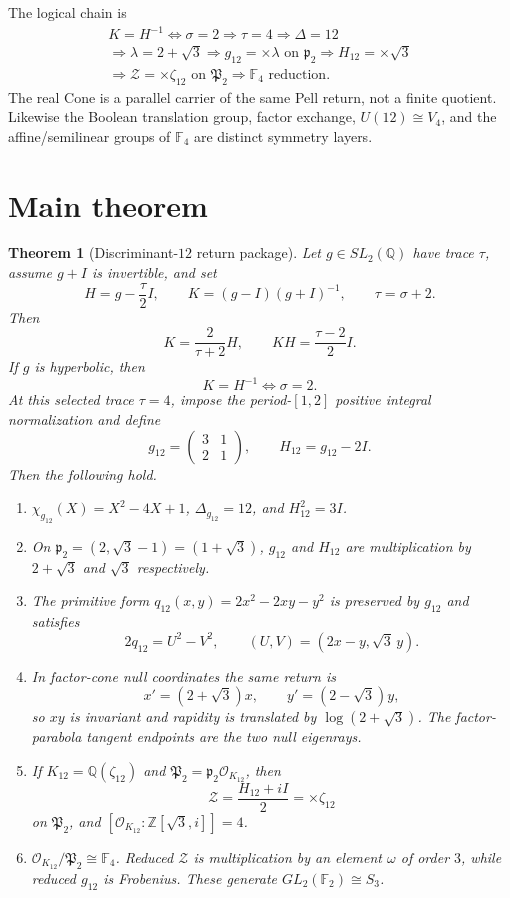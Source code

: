 \documentclass[11pt]{article}
\newtheorem{theorem}{Theorem}[section]
\theoremstyle{remark}
\newcommand{\Q}{\mathbb Q}
\newcommand{\Z}{\mathbb Z}
\newcommand{\F}{\mathbb F}
\newcommand{\OO}{\mathcal O}
\begin{document}
The logical chain is
\[
\boxed{
\begin{gathered}
K=H^{-1}\Longleftrightarrow\sigma=2
\Longrightarrow\tau=4\Longrightarrow\Delta=12\\
\Longrightarrow\lambda=2+\sqrt3
\Longrightarrow g_{12}=\times\lambda\text{ on }\mathfrak p_2
\Longrightarrow H_{12}=\times\sqrt3\\
\Longrightarrow \mathcal Z=\times\zeta_{12}\text{ on }\mathfrak P_2
\Longrightarrow \F_4\text{ reduction}.
\end{gathered}}
\]
The real Cone is a parallel carrier of the same Pell return, not a finite
quotient.  Likewise the Boolean translation group, factor exchange,
$U(12)\cong V_4$, and the affine/semilinear groups of $\F_4$ are distinct
symmetry layers.

\section{Main theorem}

\begin{theorem}[Discriminant-$12$ return package]
\label{thm:main}
Let $g\in SL_2(\Q)$ have trace $\tau$, assume $g+I$ is invertible, and set
\[
H=g-\frac\tau2I,
\qquad K=(g-I)(g+I)^{-1},
\qquad \tau=\sigma+2.
\]
Then
\[
K=\frac{2}{\tau+2}H,
\qquad KH=\frac{\tau-2}{2}I.
\]
If $g$ is hyperbolic, then
\[
K=H^{-1}\iff\sigma=2.
\]
At this selected trace $\tau=4$, impose the period-$[1,2]$ positive integral
normalization and define
\[
g_{12}=\begin{pmatrix}3&1\\2&1\end{pmatrix},
\qquad
H_{12}=g_{12}-2I.
\]
Then the following hold.
\begin{enumerate}[label=(\roman*)]
\item $\chi_{g_{12}}(X)=X^2-4X+1$, $\Delta_{g_{12}}=12$, and
$H_{12}^2=3I$.
\item On $\mathfrak p_2=(2,\sqrt3-1)=(1+\sqrt3)$, $g_{12}$ and $H_{12}$
are multiplication by $2+\sqrt3$ and $\sqrt3$ respectively.
\item The primitive form $q_{12}(x,y)=2x^2-2xy-y^2$ is preserved by
$g_{12}$ and satisfies
\[
2q_{12}=U^2-V^2,
\qquad (U,V)=(2x-y,\sqrt3\,y).
\]
\item In factor-cone null coordinates the same return is
\[
x'=(2+\sqrt3)x,
\qquad y'=(2-\sqrt3)y,
\]
so $xy$ is invariant and rapidity is translated by $\log(2+\sqrt3)$.
The factor-parabola tangent endpoints are the two null eigenrays.
\item If $K_{12}=\Q(\zeta_{12})$ and
$\mathfrak P_2=\mathfrak p_2\OO_{K_{12}}$, then
\[
\mathcal Z=\frac{H_{12}+iI}{2}=\times\zeta_{12}
\]
on $\mathfrak P_2$, and
$[\OO_{K_{12}}:\Z[\sqrt3,i]]=4$.
\item $\OO_{K_{12}}/\mathfrak P_2\cong\F_4$.  Reduced $\mathcal Z$ is
multiplication by an element $\omega$ of order $3$, while reduced $g_{12}$ is
Frobenius.  These generate $GL_2(\F_2)\cong S_3$.
\end{enumerate}
\end{theorem}
\end{document}
